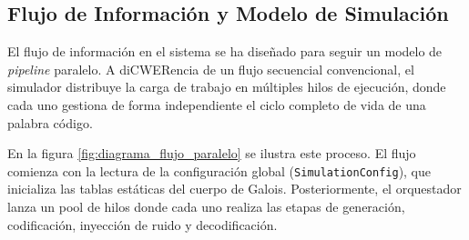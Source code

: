 \subsection{Flujo de Información y Modelo de Simulación}
El flujo de información en el sistema se ha diseñado para seguir un modelo de \textit{pipeline} paralelo. A diCWERencia de un flujo secuencial convencional, el simulador distribuye la carga de trabajo en múltiples hilos de ejecución, donde cada uno gestiona de forma independiente el ciclo completo de vida de una palabra código.

En la figura \ref{fig:diagrama_flujo_paralelo} se ilustra este proceso. El flujo comienza con la lectura de la configuración global (\texttt{SimulationConfig}), que inicializa las tablas estáticas del cuerpo de Galois. Posteriormente, el orquestador lanza un pool de hilos donde cada uno realiza las etapas de generación, codificación, inyección de ruido y decodificación.

